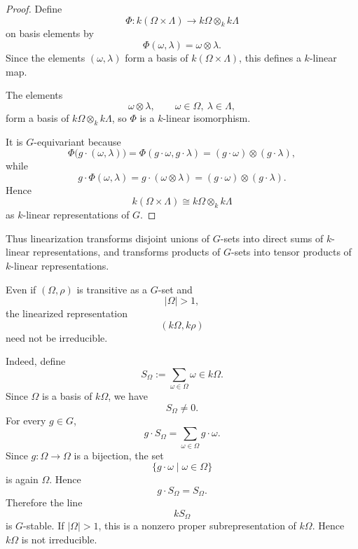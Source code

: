 \begin{proof}
    Define
    \[
        \Phi:k(\Omega\times\Lambda)\longrightarrow k\Omega\otimes_k k\Lambda
    \]
    on basis elements by
    \[
        \Phi(\omega,\lambda)=\omega\otimes \lambda.
    \]
    Since the elements \((\omega,\lambda)\) form a basis of \(k(\Omega\times\Lambda)\),
    this defines a \(k\)-linear map.

    The elements
    \[
        \omega\otimes\lambda,
        \qquad \omega\in\Omega,\ \lambda\in\Lambda,
    \]
    form a basis of \(k\Omega\otimes_k k\Lambda\), so \(\Phi\) is a \(k\)-linear
    isomorphism.

    It is \(G\)-equivariant because
    \[
        \Phi\bigl(g\cdot(\omega,\lambda)\bigr)
        =
        \Phi(g\cdot\omega,g\cdot\lambda)
        =
        (g\cdot\omega)\otimes(g\cdot\lambda),
    \]
    while
    \[
        g\cdot\Phi(\omega,\lambda)
        =
        g\cdot(\omega\otimes\lambda)
        =
        (g\cdot\omega)\otimes(g\cdot\lambda).
    \]
    Hence
    \[
        k(\Omega\times \Lambda)
        \cong
        k\Omega\otimes_k k\Lambda
    \]
    as \(k\)-linear representations of \(G\).
\end{proof}

\begin{remark}
    Thus linearization transforms disjoint unions of \(G\)-sets into direct sums of
    \(k\)-linear representations, and transforms products of \(G\)-sets into tensor
    products of \(k\)-linear representations.
\end{remark}

\begin{remark}
    Even if \((\Omega,\rho)\) is transitive as a \(G\)-set and
    \[
        |\Omega|>1,
    \]
    the linearized representation
    \[
        (k\Omega,k\rho)
    \]
    need not be irreducible.

    Indeed, define
    \[
        S_\Omega:=\sum_{\omega\in\Omega}\omega\in k\Omega.
    \]
    Since \(\Omega\) is a basis of \(k\Omega\), we have
    \[
        S_\Omega\neq 0.
    \]
    For every \(g\in G\),
    \[
        g\cdot S_\Omega
        =
        \sum_{\omega\in\Omega} g\cdot \omega.
    \]
    Since \(g:\Omega\to\Omega\) is a bijection, the set
    \[
        \{g\cdot \omega\mid \omega\in\Omega\}
    \]
    is again \(\Omega\). Hence
    \[
        g\cdot S_\Omega=S_\Omega.
    \]
    Therefore the line
    \[
        kS_\Omega
    \]
    is \(G\)-stable. If \(|\Omega|>1\), this is a nonzero proper subrepresentation
    of \(k\Omega\). Hence \(k\Omega\) is not irreducible.
\end{remark}


